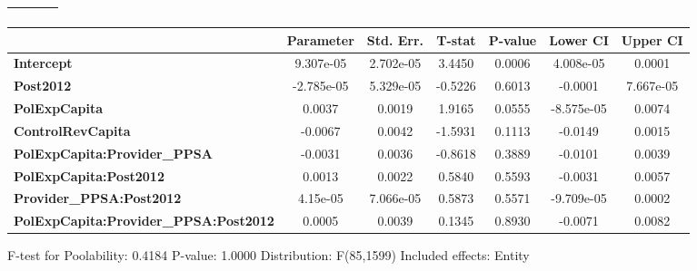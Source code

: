 \begin{center}
\begin{tabular}{lclc}
\textbf{}                                     &                    & \textbf{                     }   &                  \\
\bottomrule
\end{tabular}
\begin{tabular}{lcccccc}
                                              & \textbf{Parameter} & \textbf{Std. Err.} & \textbf{T-stat} & \textbf{P-value} & \textbf{Lower CI} & \textbf{Upper CI}  \\
\midrule
\textbf{Intercept}                            &     9.307e-05      &     2.702e-05      &      3.4450     &      0.0006      &     4.008e-05     &       0.0001       \\
\textbf{Post2012}                             &     -2.785e-05     &     5.329e-05      &     -0.5226     &      0.6013      &      -0.0001      &     7.667e-05      \\
\textbf{PolExpCapita}                         &       0.0037       &       0.0019       &      1.9165     &      0.0555      &     -8.575e-05    &       0.0074       \\
\textbf{ControlRevCapita}                     &      -0.0067       &       0.0042       &     -1.5931     &      0.1113      &      -0.0149      &       0.0015       \\
\textbf{PolExpCapita:Provider\_PPSA}          &      -0.0031       &       0.0036       &     -0.8618     &      0.3889      &      -0.0101      &       0.0039       \\
\textbf{PolExpCapita:Post2012}                &       0.0013       &       0.0022       &      0.5840     &      0.5593      &      -0.0031      &       0.0057       \\
\textbf{Provider\_PPSA:Post2012}              &      4.15e-05      &     7.066e-05      &      0.5873     &      0.5571      &     -9.709e-05    &       0.0002       \\
\textbf{PolExpCapita:Provider\_PPSA:Post2012} &       0.0005       &       0.0039       &      0.1345     &      0.8930      &      -0.0071      &       0.0082       \\
\bottomrule
\end{tabular}
\end{center}

F-test for Poolability: 0.4184 \newline
 P-value: 1.0000 \newline
 Distribution: F(85,1599) \newline
  \newline
 Included effects: Entity